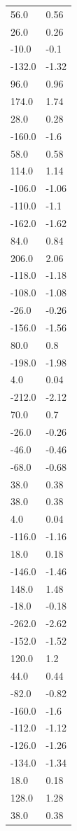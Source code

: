 \begin{longtable}{ll}
56.0 & 0.56 \\
26.0 & 0.26 \\
-10.0 & -0.1 \\
-132.0 & -1.32 \\
96.0 & 0.96 \\
174.0 & 1.74 \\
28.0 & 0.28 \\
-160.0 & -1.6 \\
58.0 & 0.58 \\
114.0 & 1.14 \\
-106.0 & -1.06 \\
-110.0 & -1.1 \\
-162.0 & -1.62 \\
84.0 & 0.84 \\
206.0 & 2.06 \\
-118.0 & -1.18 \\
-108.0 & -1.08 \\
-26.0 & -0.26 \\
-156.0 & -1.56 \\
80.0 & 0.8 \\
-198.0 & -1.98 \\
4.0 & 0.04 \\
-212.0 & -2.12 \\
70.0 & 0.7 \\
-26.0 & -0.26 \\
-46.0 & -0.46 \\
-68.0 & -0.68 \\
38.0 & 0.38 \\
38.0 & 0.38 \\
4.0 & 0.04 \\
-116.0 & -1.16 \\
18.0 & 0.18 \\
-146.0 & -1.46 \\
148.0 & 1.48 \\
-18.0 & -0.18 \\
-262.0 & -2.62 \\
-152.0 & -1.52 \\
120.0 & 1.2 \\
44.0 & 0.44 \\
-82.0 & -0.82 \\
-160.0 & -1.6 \\
-112.0 & -1.12 \\
-126.0 & -1.26 \\
-134.0 & -1.34 \\
18.0 & 0.18 \\
128.0 & 1.28 \\
38.0 & 0.38 \\

\end{longtable}
